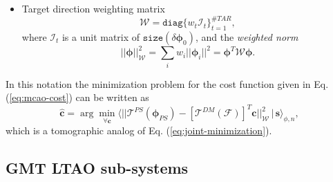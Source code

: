 \begin{itemize}
	\item Target direction weighting matrix
  \begin{equation} \label{eq:direction-weight}
		\mathcal{W} = \texttt{diag} \{ w_{t} \mathcal{I}_{t} \}_{t=1}^{\#TAR},
	\end{equation}
	where $\mathcal{I}_{t}$ is a unit matrix of $\texttt{size}(\delta
	\bm{\phi}_{0})$,
	and the \emph{weighted norm} 
	\begin{equation} \label{eq:weighted-norm}
		|| \bm{\phi} ||^{2}_{\mathcal{W}} =
		\sum_{i} w_{i} || \bm{\phi}_{i} ||^{2} =
		\bm{\phi}^{T} \mathcal{W} \bm{\phi}.
	\end{equation}

\end{itemize}
In this notation the minimization problem for the cost function given in Eq.
(\ref{eq:mcao-cost}) can be written as
\begin{equation} \label{eq:mcao-minimization}
	\hat{\bm{c}} = \arg \min_{\forall \bm{c}}
	\langle
	||
	\mathcal{T}^{PS} (\bm{\phi}_{PS}) -
	[\mathcal{T}^{DM} (\mathcal{F})]^{T} \bm{c}
	||^{2}_{\mathcal{W}} \,|\, \bm{s}
	\rangle_{\phi,n},
\end{equation}
which is a tomographic analog of Eq. (\ref{eq:joint-minimization}).



\subsection{GMT LTAO sub-systems}
\label{subsec:ltao-sub-systems}

